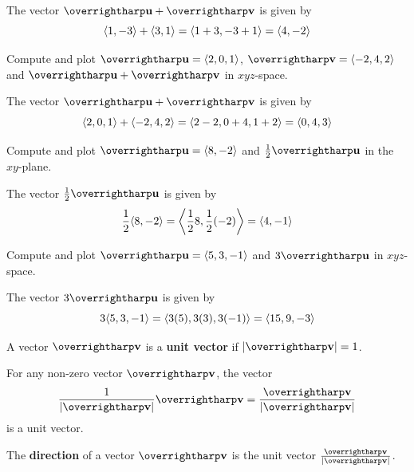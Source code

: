 \documentclass[letterpaper, twoside, 12pt]{book}
\begin{document}
          \begin{solution}
  The vector $\harpvec{u}+\harpvec{v}$ is given by
  \[
    \langle1,-3\rangle+\langle3,1\rangle=\langle1+3,-3+1\rangle=\langle4,-2\rangle
  \]
          \end{solution}

          \begin{problem}
            Compute and plot $\harpvec{u}=\<2,0,1\>$, $\harpvec{v}=\<-2,4,2\>$
            and $\harpvec{u}+\harpvec{v}$ in $xyz$-space.
          \end{problem}

          \begin{solution}
  The vector $\harpvec{u}+\harpvec{v}$ is given by
  \[
    \langle2,0,1\rangle+\langle-2,4,2\rangle=\langle2-2,0+4,1+2\rangle=\langle0,4,3\rangle
  \]
          \end{solution}

          \begin{problem}
            Compute and plot $\harpvec{u}=\<8,-2\>$ and
            $\frac{1}{2}\harpvec{u}$ in the $xy$-plane.
          \end{problem}

          \begin{solution}
  The vector $\frac{1}{2}\harpvec{u}$ is given by
  \[
    \frac{1}{2}\langle8,-2\rangle=\left\langle\frac{1}{2}8,\frac{1}{2}(-2)\right\rangle=\langle4,-1\rangle
  \]
          \end{solution}

          \begin{problem}
            Compute and plot $\harpvec{u}=\<5,3,-1\>$ and
            $3\harpvec{u}$ in $xyz$-space.
          \end{problem}

          \begin{solution}
  The vector $3\harpvec{u}$ is given by
  \[
    3\langle5,3,-1\rangle=\langle3(5),3(3),3(-1)\rangle=\langle15,9,-3\rangle
  \]
          \end{solution}



\begin{definition}
  A vector $\harpvec{v}$ is a \textbf{unit vector} if $|\harpvec v|=1$.
\end{definition}

\begin{theorem}
  For any non-zero vector $\harpvec{v}$, the vector
  \[
    \frac{1}{|\harpvec v|}\harpvec{v} = \frac{\harpvec v}{|\harpvec v|}
  \]
  is a unit vector.
\end{theorem}

\begin{definition}
  The \textbf{direction} of a vector $\harpvec v$ is the unit vector
  $\frac{\harpvec v}{|\harpvec v|}$.
\end{definition}
\end{document}

